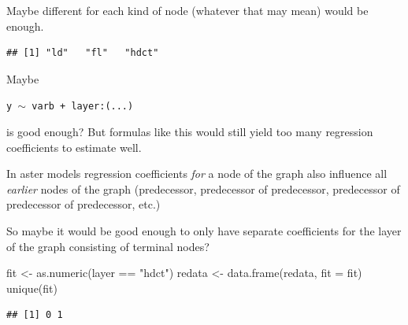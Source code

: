 \documentclass[
  ignorenonframetext,
]{beamer}
\newenvironment{Shaded}{\begin{snugshade}}{\end{snugshade}}
\newcommand{\AttributeTok}[1]{\textcolor[rgb]{0.77,0.63,0.00}{#1}}
\newcommand{\FunctionTok}[1]{\textcolor[rgb]{0.00,0.00,0.00}{#1}}
\newcommand{\NormalTok}[1]{#1}
\newcommand{\OtherTok}[1]{\textcolor[rgb]{0.56,0.35,0.01}{#1}}
\newcommand{\SpecialCharTok}[1]{\textcolor[rgb]{0.00,0.00,0.00}{#1}}
\newcommand{\StringTok}[1]{\textcolor[rgb]{0.31,0.60,0.02}{#1}}
\begin{document}
\begin{frame}[fragile]{}
\protect\hypertarget{section-16}{}
Maybe different for each kind of node (whatever that may mean) would be
enough.

\vspace{12pt}
\tiny

\begin{Shaded}
\end{Shaded}

\begin{verbatim}
## [1] "ld"   "fl"   "hdct"
\end{verbatim}

\vspace{12pt}
\normalsize

Maybe

\begin{center}
  \texttt{y $\sim$ varb + layer:(...)}
\end{center}

is good enough? But formulas like this would still yield too many
regression coefficients to estimate well.
\end{frame}

\begin{frame}[fragile]{}
\protect\hypertarget{section-17}{}
In aster models regression coefficients \emph{for} a node of the graph
also influence all \emph{earlier} nodes of the graph (predecessor,
predecessor of predecessor, predecessor of predecessor of predecessor,
etc.)

So maybe it would be good enough to only have separate coefficients for
the layer of the graph consisting of terminal nodes?

\vspace{12pt}

\begin{Shaded}
\begin{Highlighting}[]
\NormalTok{fit }\OtherTok{\textless{}{-}} \FunctionTok{as.numeric}\NormalTok{(layer }\SpecialCharTok{==} \StringTok{"hdct"}\NormalTok{) }
\NormalTok{redata }\OtherTok{\textless{}{-}} \FunctionTok{data.frame}\NormalTok{(redata, }\AttributeTok{fit =}\NormalTok{ fit)}
\FunctionTok{unique}\NormalTok{(fit)}
\end{Highlighting}
\end{Shaded}

\begin{verbatim}
## [1] 0 1
\end{verbatim}
\end{frame}
\end{document}
